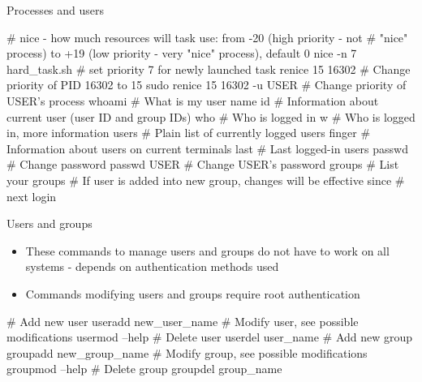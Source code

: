 \documentclass[compress, ucs, xelatex, 11pt, xcolor=svgnames, aspectratio=169,
	hyperref={
		bookmarks=true,
		unicode=true,
		colorlinks=true,
		pdftitle={Linux, command line and MetaCentrum},
		plainpages=false,
		pdfauthor={Vojtech Zeisek},
		pdfsubject={Course about use of Linux command line, writing shell scripts and using MetaCentrum of CESNET},
		pdfcreator={XeLaTeX},
		pdfkeywords={Linux, GNU, BASH, shell, command line, MetaCentrum},
		linkcolor=DarkRed, %
		anchorcolor=DarkBlue, %
		citecolor=Indigo, %
		filecolor=NavyBlue, %
		menucolor=DarkMagenta, %
		urlcolor=DarkBlue, %
		pdftex},
	url={hyphens, lowtilde} %
	]{beamer}
\begin{document}
\begin{frame}[fragile]{Processes and users}
	\begin{bashcode}
    # nice - how much resources will task use: from -20 (high priority - not
    # "nice" process) to +19 (low priority - very "nice" process), default 0
    nice -n 7 hard_task.sh # set priority 7 for newly launched task
    renice 15 16302 # Change priority of PID 16302 to 15
    sudo renice 15 16302 -u USER # Change priority of USER's process
    whoami # What is my user name
    id # Information about current user (user ID and group IDs)
    who # Who is logged in
    w # Who is logged in, more information
    users # Plain list of currently logged users
    finger # Information about users on current terminals
    last # Last logged-in users
    passwd # Change password
    passwd USER # Change USER's password
    groups # List your groups
    # If user is added into new group, changes will be effective since
    # next login
	\end{bashcode}
\end{frame}

\begin{frame}[fragile]{Users and groups}
	\begin{itemize}
		\item These commands to manage users and groups do not have to work on all systems - depends on authentication methods used
		\item Commands modifying users and groups require root authentication
	\end{itemize}
	\begin{bashcode}
    # Add new user
    useradd new_user_name
    # Modify user, see possible modifications
    usermod --help
    # Delete user
    userdel user_name
    # Add new group
    groupadd new_group_name
    # Modify group, see possible modifications
    groupmod --help
    # Delete group
    groupdel group_name
	\end{bashcode}
\end{frame}
\end{document}
